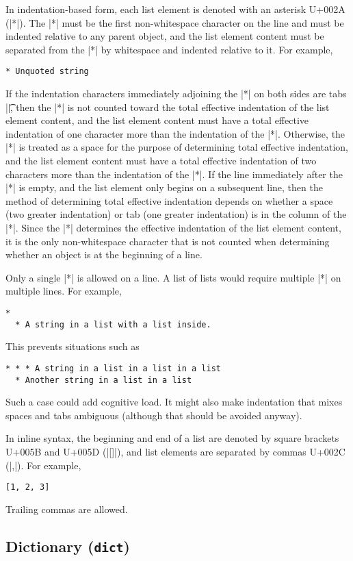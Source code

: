 \documentclass[11pt]{article}
\begin{document}
In indentation-based form, each list element is denoted with an asterisk U+002A (|*|).  The |*| must be the first non-whitespace character on the line and must be indented relative to any parent object, and the list element content must be separated from the |*| by whitespace and indented relative to it.  For example,
\begin{Verbatim}
* Unquoted string
\end{Verbatim}
If the indentation characters immediately adjoining the |*| on both sides are tabs |\t|, then the |*| is not counted toward the total effective indentation of the list element content, and the list element content must have a total effective indentation of one character more than the indentation of the |*|.  Otherwise, the |*| is treated as a space for the purpose of determining total effective indentation, and the list element content must have a total effective indentation of two characters more than the indentation of the |*|.  If the line immediately after the |*| is empty, and the list element only begins on a subsequent line, then the method of determining total effective indentation depends on whether a space (two greater indentation) or tab (one greater indentation) is in the column of the |*|.  Since the |*| determines the effective indentation of the list element content, it is the only non-whitespace character that is not counted when determining whether an object is at the beginning of a line.

Only a single |*| is allowed on a line.  A list of lists would require multiple |*| on multiple lines.  For example,
\begin{Verbatim}
*
  * A string in a list with a list inside.
\end{Verbatim}
This prevents situations such as
\begin{Verbatim}
* * * A string in a list in a list in a list
  * Another string in a list in a list
\end{Verbatim}
Such a case could add cognitive load.  It might also make indentation that mixes spaces and tabs ambiguous (although that should be avoided anyway).

In inline syntax, the beginning and end of a list are denoted by square brackets U+005B and U+005D (|[]|), and list elements are separated by commas U+002C (|,|).  For example,
\begin{Verbatim}
[1, 2, 3]
\end{Verbatim}
Trailing commas are allowed.


\subsection{Dictionary (\texttt{dict})}
\label{sec:type:dict}
\end{document}
